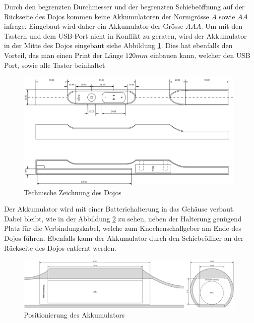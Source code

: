 Durch den begrenzten Durchmesser und der begrenzten Schiebeöffnung auf der Rückseite des Dojos kommen keine Akkumulatoren der Normgrösse $A$ sowie $AA$ infrage. Eingebaut wird daher ein Akkumulator der Grösse $AAA$. Um mit den Tastern und dem USB-Port nicht in Konflikt zu geraten, wird der Akkumulator in der Mitte des Dojos eingebaut siehe Abbildung \ref{fig:DojoQuerschnitt}. Dies hat ebenfalls den Vorteil, das man einen Print der Länge $120mm$ einbauen kann, welcher den USB Port, sowie alle Taster beinhaltet


\begin{figure}[h]
	\centering
	\includegraphics[width=\textwidth]{graphics/DojoQuerschnitt.png}
	\caption{Technische Zeichnung des Dojos}
	\label{fig:DojoQuerschnitt}
\end{figure}

\newpage

Der Akkumulator wird mit einer Batteriehalterung in das Gehäuse verbaut. Dabei bleibt, wie in der Abbildung \ref{fig:DojoAkkumulatorQuerschnitt} zu sehen, neben der Halterung genügend Platz für die Verbindungskabel, welche zum Knochenschallgeber am Ende des Dojos führen. Ebenfalls kann der Akkumulator durch den Schiebeöffner an der Rückseite des Dojos entfernt werden.


\begin{figure}[h]
	\centering
	\includegraphics[width=\textwidth]{graphics/DojoAkkumulatorQuerschnitt.png}
	\caption{Positionierung des Akkumulators}
	\label{fig:DojoAkkumulatorQuerschnitt}
\end{figure}

